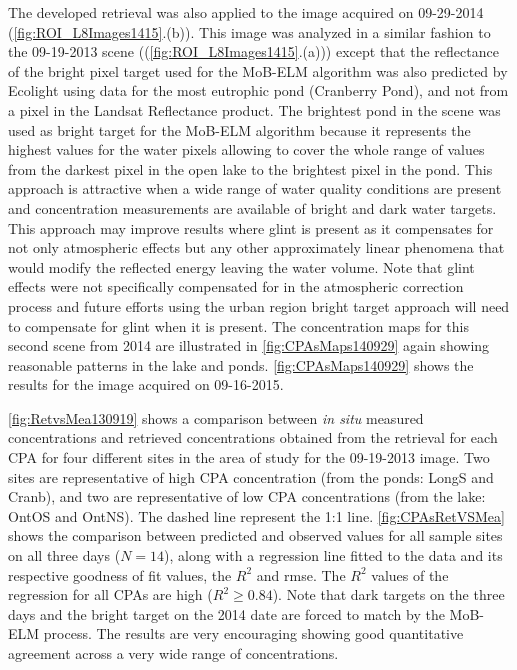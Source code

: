 The developed retrieval was also applied to the image acquired on 09-29-2014 (\autoref{fig:ROI_L8Images1415}.(b)). This image was analyzed in a similar fashion to the 09-19-2013 scene ((\autoref{fig:ROI_L8Images1415}.(a))) except that the reflectance of the bright pixel target used for the MoB-ELM algorithm was also predicted by Ecolight using data for the most eutrophic pond (Cranberry Pond), and not from a pixel in the Landsat Reflectance product. The brightest pond in the scene was used as bright target for the MoB-ELM algorithm because it represents the highest values for the water pixels allowing to cover the whole range of values from the darkest pixel in the open lake to the brightest pixel in the pond. This approach is attractive when a wide range of water quality conditions are present and concentration measurements are available of bright and dark water targets. This approach may improve results where glint is present as it compensates for not only atmospheric effects but any other approximately linear phenomena that would modify the reflected energy leaving the water volume. Note that glint effects were not specifically compensated for in the atmospheric correction process and future efforts using the urban region bright target approach will need to compensate for glint when it is present. The concentration maps for this second scene from 2014 are illustrated in \autoref{fig:CPAsMaps140929} again showing reasonable patterns in the lake and ponds. \autoref{fig:CPAsMaps140929} shows the results for the image acquired on 09-16-2015.


\autoref{fig:RetvsMea130919} shows a comparison between {\it in situ} measured concentrations and retrieved concentrations obtained from the retrieval for each CPA for four different sites in the area of study for the 09-19-2013 image. Two sites are representative of high CPA concentration (from the ponds: LongS and Cranb), and two are representative of low CPA concentrations (from the lake: OntOS and OntNS). The dashed line represent the 1:1 line. \autoref{fig:CPAsRetVSMea} shows the comparison between predicted and observed values for all sample sites on all three days ($N=14$), along with a regression line fitted to the data and its respective goodness of fit values, the $R^2$ and \gls{rmse}. The $R^2$ values of the regression for all CPAs are high ($R^2\geq0.84$). Note that dark targets on the three days and the bright target on the 2014 date are forced to match by the MoB-ELM process. The results are very encouraging showing good quantitative agreement across a very wide range of concentrations. 

